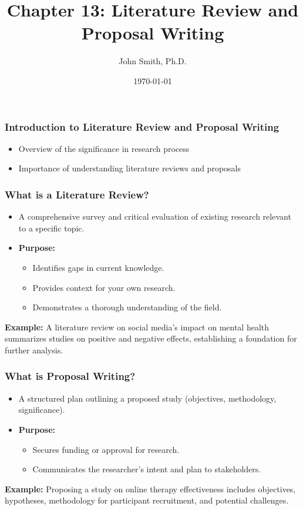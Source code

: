 \documentclass[aspectratio=169]{beamer}
\title[Chapter 13: Literature Review and Proposal Writing]{Chapter 13: Literature Review and Proposal Writing}
\author[J. Smith]{John Smith, Ph.D.}
\institute[University Name]{
  Department of Computer Science\\
  University Name\\
  \vspace{0.3cm}
  Email: email@university.edu\\
  Website: www.university.edu
}
\date{\today}
\begin{document}
\frame{\titlepage}

\begin{frame}[fragile]
    \frametitle{Introduction to Literature Review and Proposal Writing}
    \begin{itemize}
        \item Overview of the significance in research process
        \item Importance of understanding literature reviews and proposals
    \end{itemize}
\end{frame}

\begin{frame}[fragile]
    \frametitle{What is a Literature Review?}
    \begin{itemize}
        \item A comprehensive survey and critical evaluation of existing research relevant to a specific topic.
        \item \textbf{Purpose:} 
            \begin{itemize}
                \item Identifies gaps in current knowledge.
                \item Provides context for your own research.
                \item Demonstrates a thorough understanding of the field.
            \end{itemize}
    \end{itemize}
    \textbf{Example:} A literature review on social media's impact on mental health summarizes studies on positive and negative effects, establishing a foundation for further analysis.
\end{frame}

\begin{frame}[fragile]
    \frametitle{What is Proposal Writing?}
    \begin{itemize}
        \item A structured plan outlining a proposed study (objectives, methodology, significance).
        \item \textbf{Purpose:}
            \begin{itemize}
                \item Secures funding or approval for research.
                \item Communicates the researcher’s intent and plan to stakeholders.
            \end{itemize}
    \end{itemize}
    \textbf{Example:} Proposing a study on online therapy effectiveness includes objectives, hypotheses, methodology for participant recruitment, and potential challenges.
\end{frame}
\end{document}
